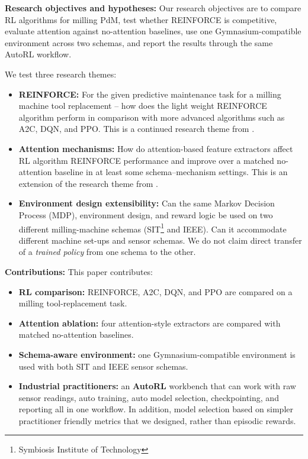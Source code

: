 \documentclass[sn-basic]{sn-jnl}%
\begin{document}
\textbf{Research objectives and hypotheses:}
Our research objectives are to compare RL algorithms for milling PdM, test whether \textsc{REINFORCE} is competitive, evaluate attention against no-attention baselines, use one Gymnasium-compatible environment across two schemas, and report the results through the same AutoRL workflow.

We test three research themes:
\begin{itemize}
    \item \textbf{REINFORCE:} For the given predictive maintenance task for a milling machine tool replacement -- how does the light weight \textsc{REINFORCE} algorithm perform in comparison with more advanced algorithms such as \textsc{A2C}, \textsc{DQN}, and \textsc{PPO}. This is a continued research theme from \cite{Siraskar2025}.
	\item \textbf{Attention mechanisms:} How do attention-based feature extractors affect RL algorithm \textsc{REINFORCE} performance and improve over a matched no-attention baseline in at least some schema--mechanism settings. This is an extension of the research theme from \cite{Siraskar2024}.
	\item \textbf{Environment design extensibility:} Can the same Markov Decision Process (MDP), environment design, and reward logic be used on two different milling-machine schemas (SIT\footnote{Symbiosis Institute of Technology} and IEEE). Can it accommodate different machine set-ups and sensor schemas. We do not claim direct transfer of a \emph{trained policy} from one schema to the other.
\end{itemize}

\textbf{Contributions:}
This paper contributes:
\begin{itemize}
    \item \textbf{RL comparison:} \textsc{REINFORCE}, \textsc{A2C}, \textsc{DQN}, and \textsc{PPO} are compared on a milling tool-replacement task.
    \item \textbf{Attention ablation:} four attention-style extractors are compared with matched no-attention baselines.
    \item \textbf{Schema-aware environment:} one Gymnasium-compatible environment is used with both SIT and IEEE sensor schemas.
    \item \textbf{Industrial practitioners:} an \textbf{AutoRL} workbench that can work with raw sensor readings, auto training, auto model selection, checkpointing, and reporting all in one workflow. In addition, model selection based on simpler practitioner friendly metrics that we designed, rather than episodic rewards. 
\end{itemize}
\end{document}
